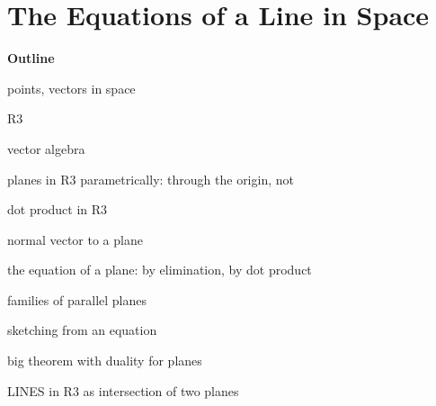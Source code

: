 \documentclass[00-livre-main.tex]{subfiles}
\begin{document}
\chapter{The Equations of a Line in Space}


\textbf{Outline}
\begin{compactitem}
\item points, vectors in space
\item R3
\item vector algebra
\item planes in R3 parametrically: through the origin, not
\item dot product in R3
\item normal vector to a plane
\item the equation of a plane: by elimination, by dot product
\item families of parallel planes
\item sketching from an equation
\item big theorem with duality for planes
\item LINES in R3 as intersection of two planes

\end{compactitem}
\end{document}
